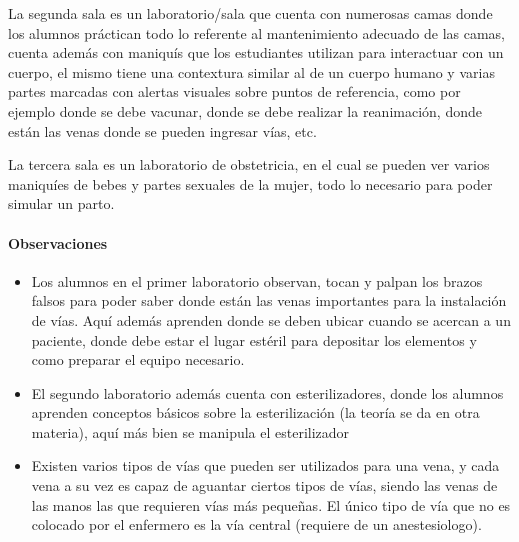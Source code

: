 La segunda sala es un laboratorio/sala que cuenta con numerosas camas
donde los alumnos práctican todo lo referente al mantenimiento adecuado
de las camas, cuenta además con maniquís que los estudiantes utilizan
para interactuar con un cuerpo, el mismo tiene una contextura similar al
de un cuerpo humano y varias partes marcadas con alertas visuales sobre
puntos de referencia, como por ejemplo donde se debe vacunar, donde se
debe realizar la reanimación, donde están las venas donde se pueden
ingresar vías, etc.

La tercera sala es un laboratorio de obstetricia, en el cual se pueden
ver varios maniquíes de bebes y partes sexuales de la mujer, todo lo
necesario para poder simular un parto.

\paragraph{Observaciones}

\begin{itemize}
\itemsep1pt\parskip0pt
\item
  Los alumnos en el primer laboratorio observan, tocan y palpan los
  brazos falsos para poder saber donde están las venas importantes para
  la instalación de vías. Aquí además aprenden donde se deben ubicar
  cuando se acercan a un paciente, donde debe estar el lugar estéril
  para depositar los elementos y como preparar el equipo necesario.
\item
  El segundo laboratorio además cuenta con esterilizadores, donde los
  alumnos aprenden conceptos básicos sobre la esterilización (la teoría
  se da en otra materia), aquí más bien se manipula el esterilizador
\item
  Existen varios tipos de vías que pueden ser utilizados para una vena,
  y cada vena a su vez es capaz de aguantar ciertos tipos de vías,
  siendo las venas de las manos las que requieren vías más pequeñas. El
  único tipo de vía que no es colocado por el enfermero es la vía
  central (requiere de un anestesiologo).
\end{itemize}
